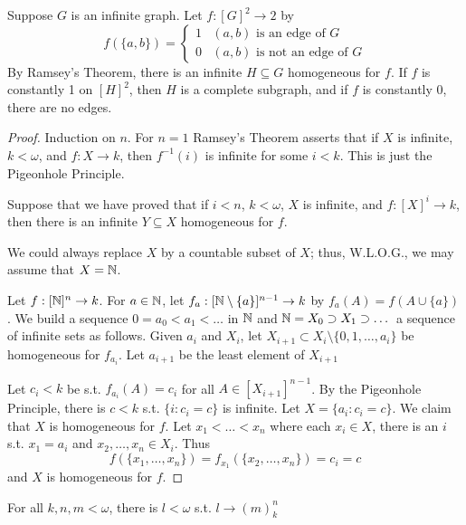 \documentclass[11pt]{article}
\begin{document}
Suppose \(G\) is an infinite graph. Let \(f:[G]^2\to 2\) by
\begin{equation*}
f(\{a,b\})=
\begin{cases}
1&(a,b)\text{ is an edge of }G\\
0&(a,b)\text{ is not an edge of }G
\end{cases}
\end{equation*}
By Ramsey's Theorem, there is an infinite \(H\subseteq G\) homogeneous for \(f\). If \(f\) is constantly
1 on \([H]^2\), then \(H\) is a complete subgraph, and if \(f\) is constantly 0, there are no
edges.

\begin{proof}
Induction on \(n\). For \(n=1\) Ramsey's Theorem asserts that if \(X\) is infinite, \(k<\omega\),
and \(f:X\to k\), then \(f^{-1}(i)\) is infinite for some \(i<k\). This is just the Pigeonhole
Principle.

Suppose that we have proved that if \(i<n\), \(k<\omega\), \(X\) is infinite, and \(f:[X]^i\to k\), then
there is an infinite \(Y\subseteq X\) homogeneous for \(f\).

We could always replace \(X\) by a countable subset of \(X\); thus, W.L.O.G., we may assume
that \(X=\mathbb{N}\).

Let \(f:[\mathbb{N}]^n\to k\). For \(a\in\mathbb{N}\), let \(f_a:[\mathbb{N}\setminus\{a\}]^{n-1}\to k\) by \(f_a(A)=f(A\cup\{a\})\). We build a
sequence \(0=a_0<a_1<\dots\) in \(\mathbb{N}\) and \(\mathbb{N}=X_0\supset X_1\supset\dots\) a sequence of infinite sets as follows.
Given \(a_i\) and \(X_i\), let \(X_{i+1}\subset X_i\setminus\{0,1,\dots,a_i\}\) be homogeneous for \(f_{a_i}\).
Let \(a_{i+1}\) be the least element of \(X_{i+1}\)

Let \(c_i<k\) be s.t. \(f_{a_i}(A)=c_i\) for all \(A\in[X_{i+1}]^{n-1}\). By the Pigeonhole
Principle, there is \(c<k\) s.t. \(\{i:c_i=c\}\) is infinite. Let \(X=\{a_i:c_i=c\}\). We claim
that \(X\) is homogeneous for \(f\). Let \(x_1<\dots<x_n\) where each \(x_i\in X\), there is an \(i\)
s.t. \(x_1=a_i\) and \(x_2,\dots,x_n\in X_i\). Thus
\begin{equation*}
f(\{x_1,\dots,x_n\})=f_{x_1}(\{x_2,\dots,x_n\})=c_i=c
\end{equation*}
and \(X\) is homogeneous for \(f\).
\end{proof}

\begin{theorem}
For all \(k,n,m<\omega\), there is \(l<\omega\) s.t. \(l\to(m)^n_k\)
\end{theorem}
\end{document}
